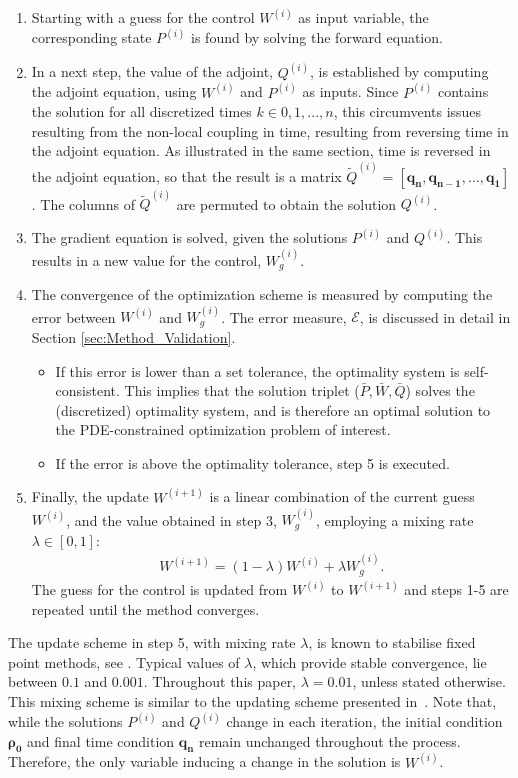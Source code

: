 \documentclass[11pt, a4paper]{article}
\theoremstyle{definition}
\newcommand{\adj}{q}
\begin{document}
\begin{enumerate}
	\item Starting with a guess for the control $W^{(i)}$ as input variable, the corresponding state $P^{(i)}$ is found by solving the forward equation.
	\item In a next step, the value of the adjoint, $Q^{(i)}$, is established by computing the adjoint equation, using $W^{(i)}$ and $P^{(i)}$ as inputs. Since $P^{(i)}$ contains the solution for all discretized times $k \in 0,1,...,n$, this circumvents issues resulting from the non-local coupling in time, resulting from reversing time in the adjoint equation. As illustrated in the same section, time is reversed in the adjoint equation, so that the result is a matrix $\tilde{Q}^{(i)} =  [\boldsymbol{\adj_n},\boldsymbol{\adj_{n-1}}, ..., \boldsymbol{\adj_1} ]$. The columns of $\tilde{Q}^{(i)}$ are permuted to obtain the solution  $Q^{(i)}$.
	\item The gradient equation is solved, given the solutions $P^{(i)}$ and $Q^{(i)}$. This results in a new value for the control, $W^{(i)}_g$.
	\item  The convergence of the optimization scheme is measured by computing the error between $W^{(i)}$ and $W^{(i)}_{g}$. The error measure, $\mathcal{E}$, is discussed in detail in Section \ref{sec:Method_Validation}. 
	\begin{itemize}
		\item  If this error is lower than a set tolerance, the optimality system is self-consistent. This implies that the solution triplet ($\bar{P},\bar{W},\bar{Q}$) solves the (discretized) optimality system, and is therefore an optimal solution to the PDE-constrained optimization problem of interest.
		\item If the error is above the optimality tolerance, step 5 is executed.
	\end{itemize}
	\item Finally, the update $W^{(i+1)}$ is a linear combination of the current guess $W^{(i)}$, and the value obtained in step 3, $W^{(i)}_{g}$, employing a mixing rate $\lambda \in [0,1]$:
	\begin{align*}
	W^{(i+1)} = (1-\lambda)W^{(i)} + \lambda W^{(i)}_{g}.
	\end{align*}
	The guess for the control is updated from $W^{(i)} $ to $W^{(i+1)} $ and steps 1-5 are repeated until the method converges. 
\end{enumerate}
\vspace{0.3cm}
The update scheme in step 5, with mixing rate $\lambda$, is known to stabilise fixed point methods, see \cite{Roth1}. Typical values of $\lambda$, which provide stable convergence, lie between $0.1$ and $0.001$. Throughout this paper, $\lambda =0.01$, unless stated otherwise. This mixing scheme is similar to the updating scheme presented in~\cite{Burger1}. 
Note that, while the solutions $P^{(i)}$ and $Q^{(i)}$ change in each iteration, the initial condition $\boldsymbol{\rho_0}$ and final time condition $\boldsymbol{\adj_n}$ remain unchanged throughout the process. Therefore, the only variable inducing a change in the solution is $W^{(i)}$.
\end{document}
